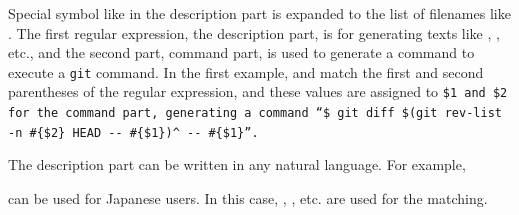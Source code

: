 \documentclass{sigchi}
\def\GIT{\texttt{git}}
\begin{document}
Special symbol like  in the description part is expanded to
the list of filenames like .
The first regular expression, the description part,
is for generating texts like
, 
, etc.,
and the second part, command part,
is used to generate a command to execute a {\GIT} command.
In the first example,  and 
match the first and second parentheses of the regular expression, and
these values are assigned to \tt{\$1} and \tt{\$2}
for the command part, generating a command
``{\smallfont\verb|$ git diff $(git rev-list -n #{$2} HEAD -- #{$1})^ -- #{$1}|}''.

The description part can be written in any natural language.
For example,

\begin{quote}
\end{quote}
  
can be used for Japanese users.
In this case,
,
, etc.
are used for the matching.
\end{document}
